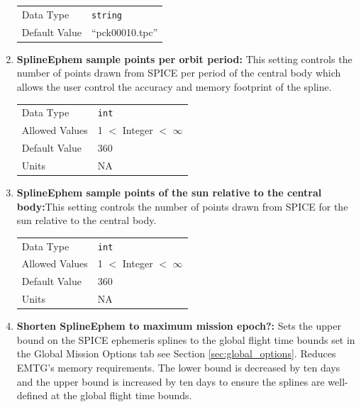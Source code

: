 \begin{enumerate}
            \begin{table}[H]
                \hspace{2cm}
                \begin{tabular}{ll}
                Data Type & \verb|string| \\
                Default Value & ``pck00010.tpc'' \\
                \end{tabular}
            \end{table}
    
        \item \textbf{SplineEphem sample points per orbit period:} This setting controls the number of points drawn from \ac{SPICE} per period of the central body which allows the user control the accuracy and memory footprint of the spline.
        
            \begin{table}[H]
                \hspace{2cm}
                \begin{tabular}{ll}
                Data Type & \verb|int| \\
                Allowed Values & 1 $<$ Integer $<$ $\infty$ \\
                Default Value & 360 \\
                Units & NA
                \end{tabular}
            \end{table}

        \item \textbf{SplineEphem sample points of the sun relative to the central body:}This setting controls the number of points drawn from \ac{SPICE} for the sun relative to the central body.
        
            \begin{table}[H]
                \hspace{2cm}
                \begin{tabular}{ll}
                Data Type & \verb|int| \\
                Allowed Values & 1 $<$ Integer $<$ $\infty$ \\
                Default Value & 360 \\
                Units & NA
                \end{tabular}
            \end{table}

        \item \textbf{Shorten SplineEphem to maximum mission epoch?:} Sets the upper bound on the \ac{SPICE} ephemeris splines to the global flight time bounds set in the Global Mission Options tab see Section \ref{sec:global_options}. Reduces \ac{EMTG}'s memory requirements. The lower bound is decreased by ten days and the upper bound is increased by ten days to ensure the splines are well-defined at the global flight time bounds.


\end{enumerate}
